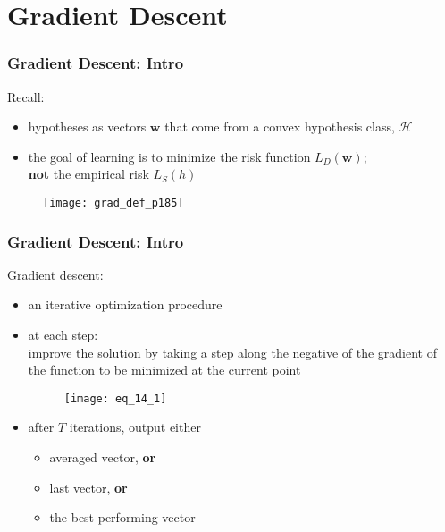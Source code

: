 \section{Gradient Descent}

\begin{frame}
\frametitle{Gradient Descent: Intro}

Recall:\\
\begin{itemize}
\item hypotheses as vectors $\mathbf{w}$ that come from a convex hypothesis class, $\mathcal{H}$
\item the goal of learning is to minimize the risk function $L_D(\mathbf{w})$;\\
      \textbf{not} the empirical risk $L_S (h)$
\end{itemize}

\begin{figure}
    \centering
    \texttt{[image: grad\_def\_p185]}
\end{figure}


\end{frame}

\begin{frame}
\frametitle{Gradient Descent: Intro}
Gradient descent:
\begin{itemize}
\item an iterative optimization procedure
\item at each step: \\
    improve the solution by
    taking a step along the negative of the gradient of the function to be minimized at the current point

    \begin{figure}
    \centering
    \texttt{[image: eq\_14\_1]}
    \end{figure}
\item after $T$ iterations, output either
    \begin{itemize}
        \item averaged vector, \textbf{or}
        \item last vector, \textbf{or}
        \item the best performing vector
    \end{itemize}
\end{itemize}

\end{frame}

